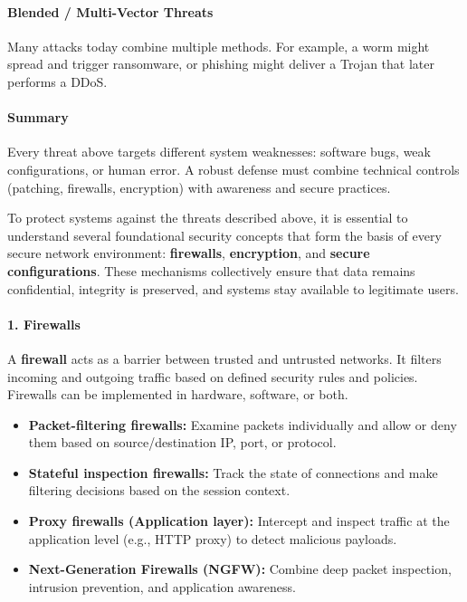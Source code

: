 \documentclass[12pt,a4paper]{report}
\begin{document}
\paragraph{Blended / Multi-Vector Threats}
Many attacks today combine multiple methods. For example, a worm might spread and trigger ransomware, or phishing might deliver a Trojan that later performs a DDoS. 

\paragraph{Summary}
Every threat above targets different system weaknesses: software bugs, weak configurations, or human error. A robust defense must combine technical controls (patching, firewalls, encryption) with awareness and secure practices.  
\newpage

To protect systems against the threats described above, it is essential to understand several foundational
security concepts that form the basis of every secure network environment: \textbf{firewalls}, 
\textbf{encryption}, and \textbf{secure configurations}. These mechanisms collectively ensure 
that data remains confidential, integrity is preserved, and systems stay available to legitimate users.

\paragraph{1. Firewalls}
A \textbf{firewall} acts as a barrier between trusted and untrusted networks. 
It filters incoming and outgoing traffic based on defined security rules and policies. 
Firewalls can be implemented in hardware, software, or both.

\begin{itemize}
  \item \textbf{Packet-filtering firewalls:} Examine packets individually and allow or deny them based on source/destination IP, port, or protocol.
  \item \textbf{Stateful inspection firewalls:} Track the state of connections and make filtering decisions based on the session context.
  \item \textbf{Proxy firewalls (Application layer):} Intercept and inspect traffic at the application level (e.g., HTTP proxy) to detect malicious payloads.
  \item \textbf{Next-Generation Firewalls (NGFW):} Combine deep packet inspection, intrusion prevention, and application awareness.
\end{itemize}
\end{document}
